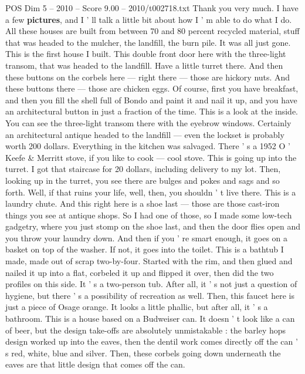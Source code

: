 \begin{textsample}{POS Dim 5 – 2010 – Score 9.00 – 2010/t002718.txt}  \label{ex:f5_pos_028}
Thank you very much.
I have a few \textbf{pictures}, and I ' ll talk a little bit about how I ' m able to do what I do.
All these houses are built from between 70 and 80 percent recycled material, stuff that was headed to the mulcher, the landfill, the burn pile.
It was all just gone.
This is the first house I built.
This double front door here with the three-light transom, that was headed to the landfill.
Have a little turret there.
And then these buttons on the corbels here — right there — those are hickory nuts.
And these buttons there — those are chicken eggs.
Of course, first you have breakfast, and then you fill the shell full of Bondo and paint it and nail it up, and you have an architectural button in just a fraction of the time.
This is a look at the inside.
You can see the three-light transom there with the eyebrow windows.
Certainly an architectural antique headed to the landfill — even the lockset is probably worth 200 dollars.
Everything in the kitchen was salvaged.
There ' s a 1952 O ' Keefe \& Merritt stove, if you like to cook — cool stove.
This is going up into the turret.
I got that staircase for 20 dollars, including delivery to my lot.
Then, looking up in the turret, you see there are bulges and pokes and sags and so forth.
Well, if that ruins your life, well, then, you shouldn ' t live there.
This is a laundry chute.
And this right here is a shoe last — those are those cast-iron things you see at antique shops.
So I had one of those, so I made some low-tech gadgetry, where you just stomp on the shoe last, and then the door flies open and you throw your laundry down.
And then if you ' re smart enough, it goes on a basket on top of the washer.
If not, it goes into the toilet.
This is a bathtub I made, made out of scrap two-by-four.
Started with the rim, and then glued and nailed it up into a flat, corbeled it up and flipped it over, then did the two profiles on this side.
It ' s a two-person tub.
After all, it ' s not just a question of hygiene, but there ' s a possibility of recreation as well.
Then, this faucet here is just a piece of Osage orange.
It looks a little phallic, but after all, it ' s a bathroom.
This is a house based on a Budweiser can.
It doesn ' t look like a can of beer, but the design take-offs are absolutely unmistakable : the barley hops design worked up into the eaves, then the dentil work comes directly off the can ' s red, white, blue and silver.
Then, these corbels going down underneath the eaves are that little design that comes off the can.

\end{textsample}
